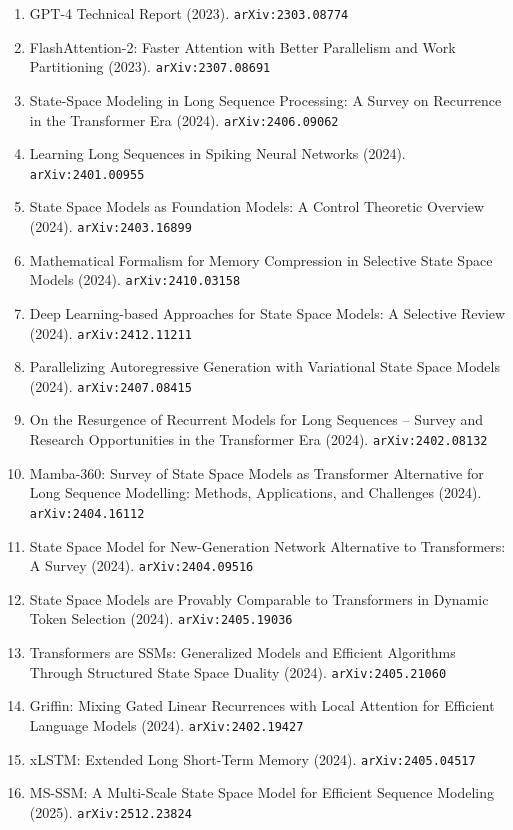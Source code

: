 \documentclass[11pt]{article}
\begin{document}
\begin{enumerate}
  \item GPT-4 Technical Report (2023). \texttt{arXiv:2303.08774}
  \item FlashAttention-2: Faster Attention with Better Parallelism and Work
  Partitioning (2023). \texttt{arXiv:2307.08691}
  \item State-Space Modeling in Long Sequence Processing: A Survey on Recurrence in the Transformer Era (2024). \texttt{arXiv:2406.09062}
  \item Learning Long Sequences in Spiking Neural Networks (2024). \texttt{arXiv:2401.00955}
  \item State Space Models as Foundation Models: A Control Theoretic Overview (2024). \texttt{arXiv:2403.16899}
  \item Mathematical Formalism for Memory Compression in Selective State Space
  Models (2024). \texttt{arXiv:2410.03158}
  \item Deep Learning-based Approaches for State Space Models: A Selective
  Review (2024). \texttt{arXiv:2412.11211}
  \item Parallelizing Autoregressive Generation with Variational State Space
  Models (2024). \texttt{arXiv:2407.08415}
  \item On the Resurgence of Recurrent Models for Long Sequences -- Survey and
  Research Opportunities in the Transformer Era (2024). \texttt{arXiv:2402.08132}
  \item Mamba-360: Survey of State Space Models as Transformer Alternative for
  Long Sequence Modelling: Methods, Applications, and Challenges (2024). \texttt{arXiv:2404.16112}
  \item State Space Model for New-Generation Network Alternative to
  Transformers: A Survey (2024). \texttt{arXiv:2404.09516}
  \item State Space Models are Provably Comparable to Transformers in Dynamic
  Token Selection (2024). \texttt{arXiv:2405.19036}
  \item Transformers are SSMs: Generalized Models and Efficient Algorithms
  Through Structured State Space Duality (2024). \texttt{arXiv:2405.21060}
  \item Griffin: Mixing Gated Linear Recurrences with Local Attention for
  Efficient Language Models (2024). \texttt{arXiv:2402.19427}
  \item xLSTM: Extended Long Short-Term Memory (2024). \texttt{arXiv:2405.04517}
  \item MS-SSM: A Multi-Scale State Space Model for Efficient Sequence Modeling (2025). \texttt{arXiv:2512.23824}

\end{enumerate}
\end{document}
